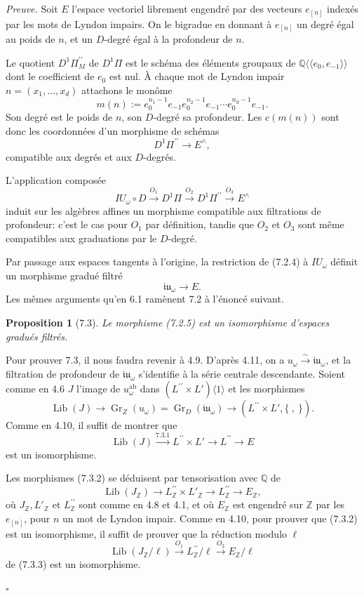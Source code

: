 \documentclass[10pt,a4paper]{article}
\newcommand{\Q}{\mathbb Q}
\newcommand{\Z}{\mathbb Z}
\newcommand{\Gr}{\operatorname{Gr}}
\newcommand{\Lib}{\operatorname{Lib}}
\theoremstyle{deligne}
\newtheorem*{proposition*}{Proposition}
\newenvironment{proofdel}{\textit{Preuve.}}{\hfill$\square$}
\begin{document}
\begin{proofdel}
Soit \(E\) l'espace vectoriel librement engendré par des vecteurs \(e_{[n]}\) indexés par les mots de Lyndon impairs. On le bigradue en donnant à \(e_{[n]}\) un degré égal au poids de \(n\), et un \(D\)-degré égal à la profondeur de \(n\).

Le quotient \(D^1\Pi_M^{\prime\prime}\) de \(D^1\Pi\) est le schéma des éléments groupaux de \(\Q\langle\!\langle e_0,e_{-1}\rangle\!\rangle\) dont le coefficient de \(e_0\) est nul. À chaque mot de Lyndon impair \(n=(x_1,\ldots,x_d)\) attachons le monôme
\[
m(n):=e_0^{n_1-1}e_{-1}e_0^{n_2-1}e_{-1}\cdots e_0^{n_d-1}e_{-1}.
\]
Son degré est le poids de \(n\), son \(D\)-degré sa profondeur. Les \(c(m(n))\) sont donc les coordonnées d'un morphisme de schémas
\[
\tag{7.2.3}
D^1\Pi^{\prime\prime}\longrightarrow E^\wedge,
\]
compatible aux degrés et aux \(D\)-degrés.

L'application composée
\[
\tag{7.2.4}
IU_\omega\circ D\xrightarrow{O_1}D^1\Pi\xrightarrow{O_2}D^1\Pi^{\prime\prime}\xrightarrow{O_3}E^\wedge
\]
induit sur les algèbres affines un morphisme compatible aux filtrations de profondeur: c'est le cas pour \(O_1\) par définition, tandis que \(O_2\) et \(O_3\) sont même compatibles aux graduations par le \(D\)-degré.

Par passage aux espaces tangents à l'origine, la restriction de (7.2.4) à \(IU_\omega\) définit un morphisme gradué filtré
\[
\tag{7.2.5}
\mathfrak{iu}_\omega\longrightarrow E.
\]
Les mêmes arguments qu'en 6.1 ramènent 7.2 à l'énoncé suivant.

\begin{proposition*}[7.3]
Le morphisme (7.2.5) est un isomorphisme d'espaces gradués filtrés.
\end{proposition*}

Pour prouver 7.3, il nous faudra revenir à 4.9. D'après 4.11, on a \(u_\omega\overset{\sim}{\longrightarrow}\mathfrak{iu}_\omega\), et la filtration de profondeur de \(\mathfrak{iu}_\omega\) s'identifie à la série centrale descendante. Soient comme en 4.6 \(J\) l'image de \(u_\omega^{\mathrm{ab}}\) dans \((L^{\prime\prime}\times L')\langle1\rangle\) et les morphismes
\[
\tag{7.3.1}
\Lib(J)\longrightarrow \Gr_Z(u_\omega)=\Gr_D(\mathfrak{iu}_\omega)\longrightarrow (L^{\prime\prime}\times L',\{\ ,\ \}).
\]
Comme en 4.10, il suffit de montrer que
\[
\tag{7.3.2}
\Lib(J)\xrightarrow{7.3.1}L^{\prime\prime}\times L'\longrightarrow L^{\prime\prime}\longrightarrow E
\]
est un isomorphisme.

Les morphismes (7.3.2) se déduisent par tensorisation avec \(\Q\) de
\[
\tag{7.3.3}
\Lib(J_\Z)\longrightarrow L^{\prime\prime}_\Z\times L'_\Z\longrightarrow L^{\prime\prime}_\Z\longrightarrow E_\Z,
\]
où \(J_\Z,L'_\Z\) et \(L^{\prime\prime}_\Z\) sont comme en 4.8 et 4.1, et où \(E_\Z\) est engendré sur \(\Z\) par les \(e_{[n]}\), pour \(n\) un mot de Lyndon impair. Comme en 4.10, pour prouver que (7.3.2) est un isomorphisme, il suffit de prouver que la réduction modulo \(\ell\)
\[
\tag{7.3.4}
\Lib(J_\Z/\ell)\xrightarrow{O_1}L^{\prime\prime}_\Z/\ell\xrightarrow{O_2}E_\Z/\ell
\]
de (7.3.3) est un isomorphisme.


\end{proofdel}
\end{document}
